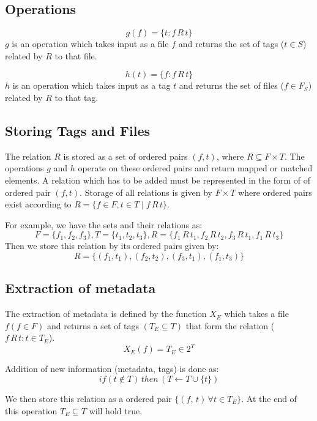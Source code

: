 \subsection{Operations}
$$g(f) = \{t : f \, R \, t\}$$
$g$ is an operation which takes input as a file $f$ and returns the set of tags ($t \in S$) related by $R$ to that file.

$$h(t) = \{f : f \, R \, t\}$$
$h$ is an operation which takes input as a tag $t$ and returns the set of files ($f \in F_{S}$) related by $R$ to that tag.


\subsection{Storing Tags and Files}
The relation $R$ is stored as a set of ordered pairs $(f,t)$, where $R \subseteq F \times T$. The operations $g$ and $h$ operate on these ordered pairs and return mapped or matched elements. A relation which has to be added must be represented in the form of of ordered pair $(f,t)$. Storage of all relations is given by $F \times T$ where ordered pairs exist according to $R = \{f \in F, t \in T \mid f\, R \,t\}$.

\noindent For example, we have the sets and their relations as: 
$$F = \{ f_{1}, f_{2}, f_{3} \}, T = \{ t_{1}, t_{2}, t_{3} \}, R = \{f_{1} \, R  \, t_{1}, f_{2}  \, R  \, t_{2}, f_{3}  \, R  \, t_{1}, f_{1}  \, R  \, t_{3}\}$$
Then we store this relation by its ordered pairs given by:
$$R = \{(f_{1},t_{1}),(f_{2}, t_{2}),(f_{3}, t_{1}),(f_{1}, t_{3})\}$$

\subsection{Extraction of metadata}
The extraction of metadata is defined by the function $X_{E}$ which takes a file $f(f \in F)$ and returns a set of tags $(T_{E} \subseteq T)$ that form the relation ($f  \, R  \, t : t \in T_{E}$). 
$$X_{E}(f) = T_{E} \in 2^{T}$$

\noindent Addition of new information (metadata, tags) is done as:
$${if (t \notin T) \, then \, (T \gets T \cup \{t\})}$$

\noindent We then store this relation as a ordered pair $\{(f, \, t) \, \forall t \in T_{E}\}$. At the end of this operation $T_{E} \subseteq T$ will hold true. 

